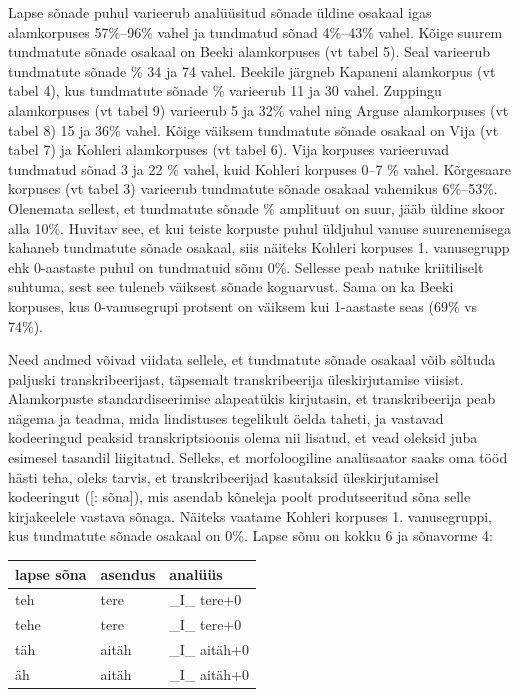 \documentclass[12pt]{article}
\begin{document}
Lapse sõnade puhul varieerub analüüsitud sõnade üldine osakaal igas alamkorpuses 57\%--96\% vahel ja tundmatud sõnad 4\%--43\% vahel. Kõige suurem tundmatute sõnade osakaal on Beeki alamkorpuses (vt tabel 5). Seal varieerub tundmatute sõnade \% 34 ja 74 vahel. Beekile järgneb Kapaneni alamkorpus (vt tabel 4), kus tundmatute sõnade \% varieerub 11 ja 30 vahel. Zuppingu alamkorpuses (vt tabel 9) varieerub 5 ja 32\% vahel ning Arguse alamkorpuses (vt tabel 8) 15 ja 36\% vahel. Kõige väiksem tundmatute sõnade osakaal on Vija (vt tabel 7) ja Kohleri alamkorpuses (vt tabel 6). Vija korpuses varieeruvad tundmatud sõnad 3 ja 22 \% vahel, kuid Kohleri korpuses 0--7 \% vahel. Kõrgesaare korpuses (vt tabel 3) varieerub tundmatute sõnade osakaal vahemikus 6\%--53\%. Olenemata sellest, et tundmatute sõnade \% amplituut on suur, jääb üldine skoor alla 10\%. Huvitav see, et kui teiste korpuste puhul üldjuhul vanuse suurenemisega kahaneb tundmatute sõnade osakaal, siis näiteks Kohleri korpuses 1. vanusegrupp ehk 0-aastaste puhul on tundmatuid sõnu 0\%. Sellesse peab natuke kriitiliselt suhtuma, sest see tuleneb väiksest sõnade koguarvust. Sama on ka Beeki korpuses, kus 0-vanusegrupi protsent on väiksem kui 1-aastaste seas (69\% vs 74\%).

Need andmed võivad viidata sellele, et tundmatute sõnade osakaal võib sõltuda paljuski transkribeerijast, täpsemalt transkribeerija üleskirjutamise viisist. Alamkorpuste standardiseerimise alapeatükis kirjutasin, et transkribeerija peab nägema ja teadma, mida lindistuses tegelikult öelda taheti, ja vastavad kodeeringud peaksid transkriptsioonis olema nii lisatud, et vead oleksid juba esimesel tasandil liigitatud.
Selleks, et morfoloogiline analüsaator saaks oma tööd hästi teha, oleks tarvis, et transkribeerijad kasutaksid üleskirjutamisel kodeeringut ([: sõna]), mis asendab kõneleja poolt produtseeritud sõna selle kirjakeelele vastava sõnaga. Näiteks vaatame Kohleri korpuses 1. vanusegruppi, kus tundmatute sõnade osakaal on 0\%. Lapse sõnu on kokku 6 ja sõnavorme 4:

\begin{table}[H]
\begin{tabular}{|l|l|l|}
\hline
lapse sõna & asendus & analüüs       \\ \hline\hline
teh        & tere    & \_I\_ tere+0  \\ \hline
tehe       & tere    & \_I\_ tere+0  \\ \hline
täh        & aitäh   & \_I\_ aitäh+0 \\ \hline
äh         & aitäh   & \_I\_ aitäh+0 \\ \hline
\end{tabular}
\end{table}
\end{document}
